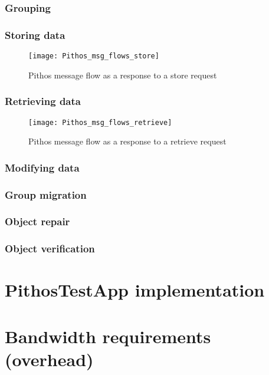     \subsubsection{Grouping}
    \label{grouping_implementation}

    \subsubsection{Storing data}
    \label{store_implementation}
    
\begin{figure}[htbp]
 \centering
 \texttt{[image: Pithos\_msg\_flows\_store]}
 \caption{Pithos message flow as a response to a store request}
 \label{fig_pithos_msg_flow_store}
\end{figure}

    \subsubsection{Retrieving data}
    \label{retrieve_implementation}
    
\begin{figure}[htbp]
 \centering
 \texttt{[image: Pithos\_msg\_flows\_retrieve]}
 \caption{Pithos message flow as a response to a retrieve request}
 \label{fig_pithos_msg_flow_retrieve}
\end{figure}

    \subsubsection{Modifying data}
    \label{modify_implementation}

    \subsubsection{Group migration}
    \label{group_migration_implementation}
    
    \subsubsection{Object repair}
    \label{object_repair_implementation}
    
    \subsubsection{Object verification}
    \label{object_verification_implementation}

\section{PithosTestApp implementation}

\section{Bandwidth requirements (overhead)}
